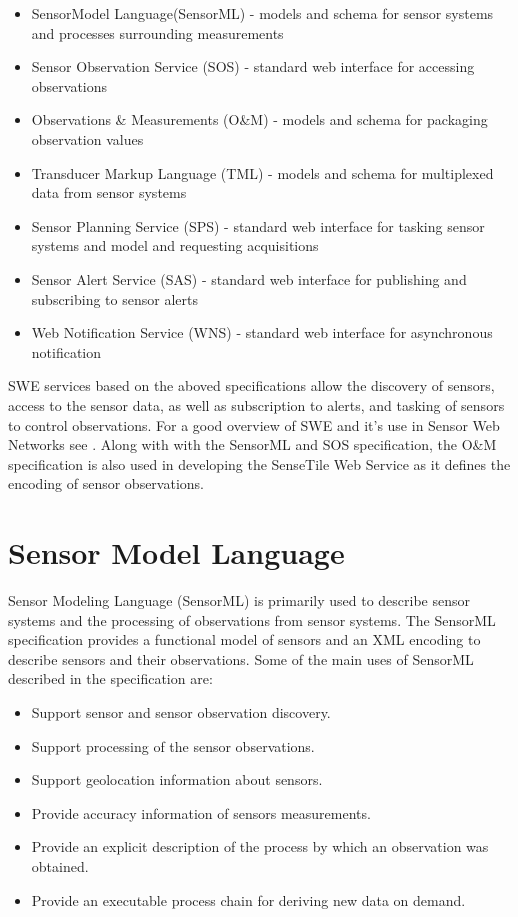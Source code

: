 \documentclass[]{final_report}
\begin{document}
\begin{itemize}
\item  SensorModel Language(SensorML) - models and schema for sensor systems and processes surrounding measurements
\item  Sensor Observation Service (SOS) - standard web interface for accessing observations
\item  Observations \& Measurements (O\&M) - models and schema for packaging observation values
\item  Transducer Markup Language (TML) - models and schema for multiplexed data from sensor systems
\item  Sensor Planning Service (SPS) - standard web interface for tasking sensor systems and model and requesting acquisitions
\item   Sensor Alert Service (SAS) - standard web interface for publishing and subscribing to sensor alerts
\item   Web Notification Service (WNS) - standard web interface for asynchronous notification
\end{itemize}

SWE services based on the aboved specifications allow the discovery of sensors, access to the sensor data, as well as subscription to alerts, and tasking of sensors to control observations. For a good overview of SWE and it's use in Sensor Web Networks see \cite{SWEArchref}.  Along with with the SensorML and SOS specification, the O\&M specification is also used in developing the SenseTile Web Service as it defines the encoding of sensor observations. 


\section{Sensor Model Language}\label{SMLsection}
Sensor Modeling Language (SensorML) is primarily used to describe sensor systems and the processing of observations from sensor systems. The SensorML specification\cite{SMLref} provides a functional model of sensors and an XML encoding to describe sensors and their observations. Some of the main uses of SensorML described in the specification are:
\begin{itemize}
\item Support sensor and sensor observation discovery.
\item Support processing of the sensor observations.
\item Support geolocation information about sensors.
\item Provide accuracy information of sensors measurements.
\item Provide an explicit description of the process by which an observation was obtained.
\item Provide an executable process chain for deriving new data on demand.
\end{itemize}
\end{document}
